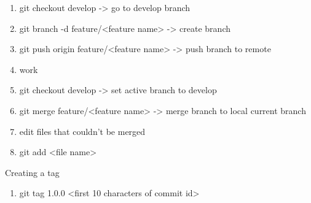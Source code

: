 \documentclass{scrartcl}
\begin{document}
\begin{enumerate}[1]
\item git checkout develop	-\textgreater{} go to develop branch
\item git branch -d feature/\textless{}feature name\textgreater{}		-\textgreater{} create branch
\item git push origin feature/\textless{}feature name\textgreater{}	-\textgreater{} push branch to remote
\item work
\item git checkout develop					-\textgreater{} set active branch to develop
\item git merge feature/\textless{}feature name\textgreater{}		-\textgreater{} merge branch to local current branch
\item edit files that couldn't be merged
\item git add \textless{}file name\textgreater{}
\end{enumerate}


Creating a tag 

\begin{enumerate}[1]
\item git tag 1.0.0 \textless{}first 10 characters of commit id\textgreater{}
\end{enumerate}
\end{document}
